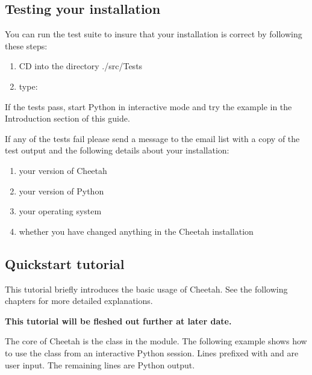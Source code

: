 \subsection{Testing your installation}
\label{gettingStarted.test}

You can run the test suite to insure that your installation is correct by
following these steps:
\begin{enumerate}
\item CD into the directory ./src/Tests   
\item type:  
\end{enumerate}

If the tests pass, start Python in interactive mode and try the example in the
Introduction section of this guide.

If any of the tests fail please send a message to the email list with a copy of
the test output and the following details about your installation:

\begin{enumerate}
\item your version of Cheetah
\item your version of Python
\item your operating system
\item whether you have changed anything in the Cheetah installation
\end{enumerate}

\subsection{Quickstart tutorial}
\label{gettingStarted.tutorial}

This tutorial briefly introduces the basic usage of Cheetah.  See the
following chapters for more detailed explanations.  

{\bf This tutorial will be fleshed out further at later date.} 

The core of Cheetah is the  class in the 
module. The following example shows how to use the  class from an
interactive Python session. Lines prefixed with \code{>>>} and  are
user input.  The remaining lines are Python output.

